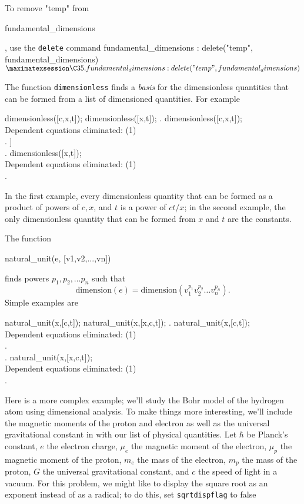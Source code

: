\noindent To remove "temp" from  
\begin{verb} fundamental_dimensions \end{verb}, use the {\tt delete} command
\beginmaximasession
fundamental_dimensions : delete("temp", fundamental_dimensions)$
\maximatexsession
\C35.  fundamental_dimensions : delete("temp", fundamental_dimensions)$ \\
\endmaximasession

The function {\tt dimensionless} finds a {\em basis\/} for the
dimensionless quantities that can be formed from a list of
dimensioned  quantities.  For example

\beginmaximasession
dimensionless([c,x,t]);
dimensionless([x,t]);
\maximatexsession
{}.  dimensionless([c,x,t]); \\
\p
Dependent equations eliminated:  (1) \\
.  \left[ \frac{c\*t}{x},\linebreak[0]1 \right] \\
.  dimensionless([x,t]); \\
\p
Dependent equations eliminated:  (1) \\
.  \left[ 1 \right] \\
\endmaximasession

\noindent In the first example, every dimensionless quantity
that can be formed as a product of powers of $c,x$, and $t$ is
a power of $c t/x$; in the second example, the only
dimensionless quantity that can be formed from
$x$ and $t$ are the constants.

The function \begin{verb} natural_unit(e, [v1,v2,...,vn]) \end{verb}
 finds powers $p_1,p_2, \dots p_n$ such that
\[
  \mbox{dimension}(e) = \mbox{dimension} (v_1^{p_1} v_2^{p_2} \dots v_n^{p_n}).
\]
Simple examples are

\beginmaximasession
natural_unit(x,[c,t]);
natural_unit(x,[x,c,t]);
\maximatexsession
{}.  natural_unit(x,[c,t]); \\
\p
Dependent equations eliminated:  (1) \\
.  \left[ c\*t \right] \\
.  natural_unit(x,[x,c,t]); \\
\p
Dependent equations eliminated:  (1) \\
.  \left[ x \right] \\
\endmaximasession

Here is a more complex example; we'll study the Bohr model of
the hydrogen atom using dimensional analysis.  To make things
more interesting, we'll include the magnetic moments of the
proton and electron as well as the universal gravitational
constant in with our list of physical quantities. 
Let  $\hbar$ be Planck's constant, $e$ the electron charge, $\mu_e$ the
magnetic moment of the electron, $\mu_p$ the magnetic
moment of the proton, $m_e$ the mass of the electron, $m_p$
the mass of the proton, $G$ the universal gravitational constant,
 and $c$ the speed of light in a vacuum.  For this problem, we might 
like to display the square root as an exponent instead  of as a radical;
to do this, set {\tt sqrtdispflag} to false

